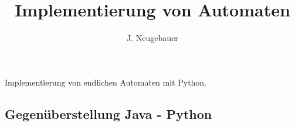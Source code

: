 \documentclass[10pt, a4paper]{scrartcl}
\author{J. Neugebauer}
\title{Implementierung von Automaten}
\date{\Heute}
\begin{document}
\ReiheTitel

Implementierung von endlichen Automaten mit Python.

\subsection*{Gegenüberstellung Java - Python}
\end{document}
